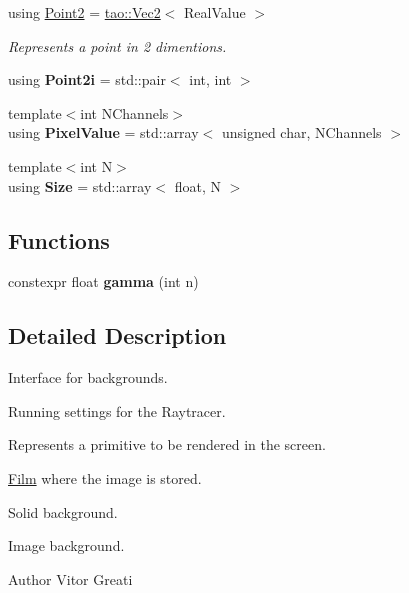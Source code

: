 \begin{DoxyCompactItemize}
\mbox{\label{namespaceomg_a18e42fb7bbc4159e9137145b866ec578}} 
using \mbox{\hyperlink{namespaceomg_a18e42fb7bbc4159e9137145b866ec578}{Point2}} = \mbox{\hyperlink{namespacetao_a7c689316b82c94e7228f42ac874a548b}{tao\+::\+Vec2}}$<$ Real\+Value $>$
\begin{DoxyCompactList}\small\item\em Represents a point in 2 dimentions. \end{DoxyCompactList}\item 
\mbox{\label{namespaceomg_a3de4fc5981be4c324c9cf84a4f845f8b}} 
using {\bfseries Point2i} = std\+::pair$<$ int, int $>$
\item 
\mbox{\label{namespaceomg_adfd06c82d92702d5d6411fb77c25af04}} 
{\footnotesize template$<$int N\+Channels$>$ }\\using {\bfseries Pixel\+Value} = std\+::array$<$ unsigned char, N\+Channels $>$
\item 
\mbox{\label{namespaceomg_a3f437d3821402dd1b1d1ddb5c73f6597}} 
{\footnotesize template$<$int N$>$ }\\using {\bfseries Size} = std\+::array$<$ float, N $>$
\end{DoxyCompactItemize}
\subsection*{Functions}
\begin{DoxyCompactItemize}
\item 
\mbox{\label{namespaceomg_a1d1cf9f26654c270189c08d6e4aedf0a}} 
constexpr float {\bfseries gamma} (int n)
\end{DoxyCompactItemize}


\subsection{Detailed Description}
Interface for backgrounds. 

Running settings for the Raytracer.

Represents a primitive to be rendered in the screen.

\mbox{\hyperlink{classomg_1_1_film}{Film}} where the image is stored.

Solid background.

Image background.

\begin{DoxyAuthor}{Author}
Vitor Greati 
\end{DoxyAuthor}
